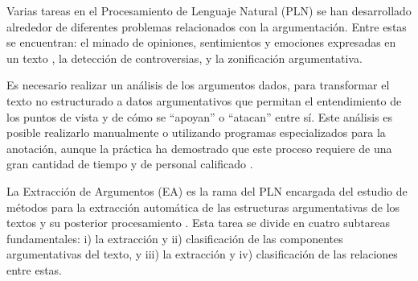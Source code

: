 \documentclass[a4paper,11pt,twocolumn,twoside]{article}
\begin{document}

Varias tareas en el Procesamiento de Lenguaje Natural (PLN) se han desarrollado alrededor
de diferentes problemas relacionados con 
la argumentación. Entre estas se encuentran: el minado de opiniones, sentimientos y 
emociones expresadas en un texto 
\cite{liu2010sentiment}, la detección de controversias, y la zonificación
argumentativa. 

Es necesario realizar un 
análisis de los argumentos dados, para transformar el texto no estructurado a datos argumentativos 
que permitan el entendimiento de los puntos de vista y de cómo se ``apoyan'' o ``atacan'' entre sí. Este análisis
es posible realizarlo manualmente o utilizando programas
especializados para la anotación, aunque la práctica ha demostrado que este proceso requiere 
de una gran cantidad de tiempo y de personal calificado \cite{eger2018cross}. 


La Extracción de Argumentos (EA) es la rama del PLN encargada
del estudio de métodos para la extracción automática de las estructuras argumentativas de 
los textos y su posterior procesamiento \cite{lawrence2020argument}. Esta tarea se divide en 
cuatro subtareas fundamentales: i) la extracción y ii) clasificación de las componentes 
argumentativas del texto, y iii) la extracción y 
iv) clasificación de las relaciones entre estas. 

\end{document}

